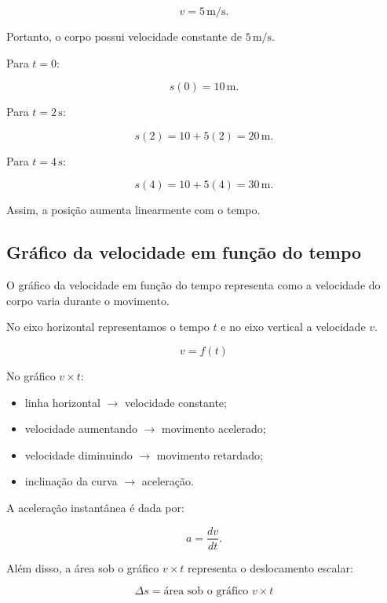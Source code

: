 \documentclass[a4paper,12pt]{article}
\begin{document}
\[
v=5\,\text{m/s}.
\]

Portanto, o corpo possui velocidade constante de $5\,\text{m/s}$.

\begin{exemplo}

Para $t=0$:

\[
s(0)=10\,\text{m}.
\]

Para $t=2\,\text{s}$:

\[
s(2)=10+5(2)=20\,\text{m}.
\]

Para $t=4\,\text{s}$:

\[
s(4)=10+5(4)=30\,\text{m}.
\]

Assim, a posição aumenta linearmente com o tempo.

\end{exemplo}

\subsection{Gráfico da velocidade em função do tempo}

O gráfico da velocidade em função do tempo representa como a velocidade
do corpo varia durante o movimento.

No eixo horizontal representamos o tempo $t$ e no eixo vertical a velocidade
$v$.

\[
v=f(t)
\]

\begin{ideia}

No gráfico $v \times t$:

\begin{itemize}
    \item linha horizontal $\rightarrow$ velocidade constante;
    \item velocidade aumentando $\rightarrow$ movimento acelerado;
    \item velocidade diminuindo $\rightarrow$ movimento retardado;
    \item inclinação da curva $\rightarrow$ aceleração.
\end{itemize}

A aceleração instantânea é dada por:

\[
a=\frac{dv}{dt}.
\]

Além disso, a área sob o gráfico $v\times t$ representa o deslocamento
escalar:

\[
\boxed{\Delta s=\text{área sob o gráfico }v\times t}
\]

\end{ideia}
\end{document}
